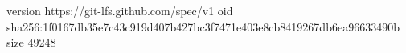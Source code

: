 version https://git-lfs.github.com/spec/v1
oid sha256:1f0167db35e7c43c919d407b427bc3f7471e403e8cb8419267db6ea96633490b
size 49248
